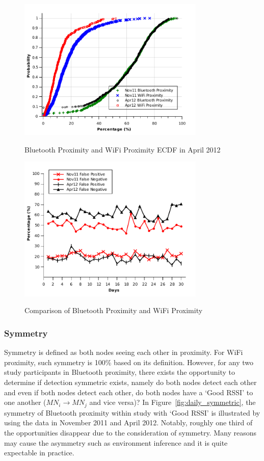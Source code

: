 \begin{figure}[tbp]
\centering 
{\includegraphics[width=3.5in]{graphs/bt_wifi_distribution_201204.pdf}}
\caption{Bluetooth Proximity and WiFi Proximity ECDF in April 2012} 
\label{fig:bt_wifi_distribution}
\end{figure} 

\begin{figure}[tbp]
\centering 
{\includegraphics[width=3.5in]{graphs/wifi_falsenegative.pdf}}
\caption{Comparison of Bluetooth Proximity and WiFi Proximity} 
\label{fig:wifi_fp_fn0}
\end{figure} 

\subsubsection*{Symmetry}

Symmetry is defined as both nodes seeing each other in proximity. For WiFi proximity, such symmetry is 100\% based on its definition. However, for any two study participants in Bluetooth proximity, there exists the opportunity to determine if detection symmetric exists, namely do both nodes detect each other and even if both nodes detect each other, do both nodes have a `Good RSSI' to one another ($MN_i \rightarrow MN_j$ and vice versa)? In Figure~\ref{fig:daily_symmetric}, the symmetry of Bluetooth proximity within study with `Good RSSI' is illustrated by using the data in November 2011 and April 2012. Notably, roughly one third of the opportunities disappear due to the consideration of symmetry. Many reasons may cause the asymmetry such as environment inference and it is quite expectable in practice. 

